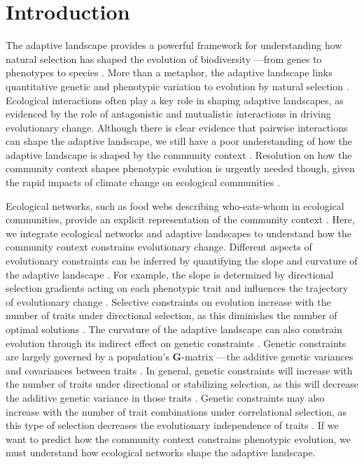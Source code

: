 \documentclass[11pt,]{article}
\begin{document}
\newpage

\section{Introduction}\label{introduction}

The adaptive landscape provides a powerful framework for understanding
how natural selection has shaped the evolution of biodiversity ---from
genes to phenotypes to species
\citep{Wright1931, Simpson1944, Arnold2001}. More than a metaphor, the
adaptive landscape links quantitative genetic and phenotypic variation
to evolution by natural selection
\citep{Lande1979, Arnold1984applications, Arnold1984theory}. Ecological
interactions often play a key role in shaping adaptive landscapes, as
evidenced by the role of antagonistic \citep{Schluter2000, Abrams2000}
and mutualistic \citep{Bronstein2006} interactions in driving
evolutionary change. Although there is clear evidence that pairwise
interactions can shape the adaptive landscape, we still have a poor
understanding of how the adaptive landscape is shaped by the community
context \citep{McPeek2017, terHorst2018}. Resolution on how the
community context shapes phenotypic evolution is urgently needed though,
given the rapid impacts of climate change on ecological communities
\citep{Scheffers2016}.

Ecological networks, such as food webs describing who-eats-whom in
ecological communities, provide an explicit representation of the
community context \citep{Bascompte2014, McCann2012}. Here, we integrate
ecological networks and adaptive landscapes to understand how the
community context constrains evolutionary change. Different aspects of
evolutionary constraints can be inferred by quantifying the slope and
curvature of the adaptive landscape \citep{Arnold1992}. For example, the
slope is determined by directional selection gradients acting on each
phenotypic trait and influences the trajectory of evolutionary change
\citep{Lande1979, Arnold1992}. Selective constraints on evolution
increase with the number of traits under directional selection, as this
diminishes the number of optimal solutions \citep{Arnold2003}. The
curvature of the adaptive landscape can also constrain evolution through
its indirect effect on genetic constraints
\citep{Arnold1992, Hansen2008}. Genetic constraints are largely governed
by a population's \textbf{G}-matrix ---the additive genetic variances
and covariances between traits \citep{Hansen2008}. In general, genetic
constraints will increase with the number of traits under directional or
stabilizing selection, as this will decrease the additive genetic
variance in those traits \citep{Hansen2008}. Genetic constraints may
also increase with the number of trait combinations under correlational
selection, as this type of selection decreases the evolutionary
independence of traits \citep{Hansen2008}. If we want to predict how the
community context constrains phenotypic evolution, we must understand
how ecological networks shape the adaptive landscape.
\end{document}
